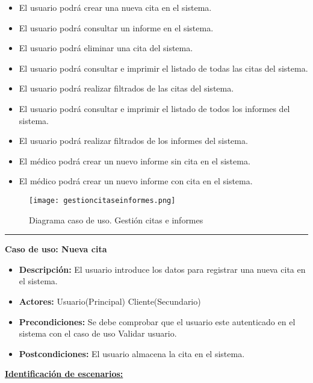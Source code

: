 \begin{itemize}
 \item El usuario podrá crear una nueva cita en el sistema.
 \item El usuario podrá consultar un informe en el sistema.
 \item El usuario podrá eliminar una cita del sistema.
 \item El usuario podrá consultar e imprimir el listado de todas las citas del sistema.
 \item El usuario podrá realizar filtrados de las citas del sistema.
 \item El usuario podrá consultar e imprimir el listado de todos los informes del sistema.
 \item El usuario podrá realizar filtrados de los informes del sistema. 
 \item El médico podrá crear un nuevo informe sin cita en el sistema.
 \item El médico podrá crear un nuevo informe con cita en el sistema.

\end{itemize}
\begin{figure}[H]
  \centering
    \texttt{[image: gestioncitaseinformes.png]}
  \caption{Diagrama caso de uso. Gestión citas e informes}
  \label{cu8}
\end{figure}
\smallskip
\hrule height 1pt
\smallskip
\textbf{Caso de uso: Nueva cita}
\begin{itemize}\renewcommand{\labelitemi}{$\cdot$}
  \item \textbf{Descripción:} El usuario introduce los datos para registrar una nueva cita en el sistema.
  \item \textbf{Actores:} Usuario(Principal) Cliente(Secundario)
  \item \textbf{Precondiciones:} Se debe comprobar que el usuario este autenticado en el sistema con el caso de uso Validar usuario.
  \item \textbf{Postcondiciones:} El usuario almacena la cita en el sistema.
\end{itemize}
\underline{\textbf{Identificación de escenarios:}}
